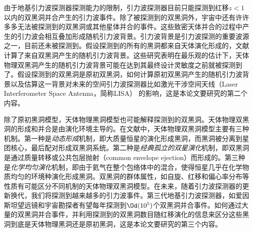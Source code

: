 由于地基引力波探测器探测能力的限制，\lvc 引力波探测器目前只能探测到红移$z<1$以内的双黑洞并合产生的引力波事件\citep{TheLIGOScientific:2016htt,Aasi:2013wya}。除了被\lvc 探测到的双黑洞外，宇宙中还有许许多多无法被\lvc 探测到的双黑洞或其他星体并合的事件。这些致密天体并合的过程中产生的引力波会相互叠加形成随机引力波背景\citep{Christensen:1992wi}。引力波背景是引力波探测的重要波源之一，目前还未被探测到。假设\lvc 探测到的所有的黑洞都来自天体演化形成的\citep{Belczynski:2010tb,Miller:2016krr,TheLIGOScientific:2016htt,Belczynski:2016obo,Stevenson:2017tfq}，文献\cite{TheLIGOScientific:2016wyq,TheLIGOScientific:2016dpb}计算了来自双黑洞产生的随机引力波背景。这些研究表明在最乐观的估计下，天体物理双黑洞产生的随机引力波背景可能在\lvc 达到其最终设计灵敏度之前就被探测到了。假设\lvc 探测到的双黑洞是原初双黑洞，如何计算原初双黑洞产生的随机引力波背景以及估算这一背景对未来的空间引力波探测器比如激光干涉空间天线（Laser Interferometer Space Antenna，简称LISA） \citep{Audley:2017drz}的影响，这是本论文要研究的第二个内容。


除了原初黑洞模型，天体物理黑洞模型也可能解释\lvc 探测到的双黑洞。天体物理双黑洞的形成和并合是由演化环境主导的。在文献中，天体物理双黑洞模型主要有三种机制。第一种是\textit{动态形成}机制，即大质量恒星的演化形成黑洞，而黑洞被分离到星团核心，最后配对形成双黑洞系统\cite{Rodriguez:2015oxa,Rodriguez:2016kxx,Park:2017zgj}。第二种是\textit{经典孤立的双星演化}机制，即双黑洞是通过质量转移或公共包层抛射（common envelope ejection）而形成的\cite{Belczynski:2014iua,Belczynski:2016obo,Woosley:2016nnw,Rodriguez:2018rmd,Choksi:2018jnq}。第三种是\textit{化学均匀演化}机制，即由于氦气在整个包络体中的混合\cite{2010AIPC.1314..291D,deMink:2016vkw}，使得恒星几乎在化学物质均匀的环境种演化形成黑洞。双黑洞的群体属性，如自旋\cite{Farr:2017uvj,Tiwari:2018qch,Ng:2018neg,Stevenson:2017dlk,Bogomazov:2018prw,Lopez:2018nkj,Sedda:2018nxm,Farr:2017gtv}、红移\cite{Fishbach:2018edt,Emami:2018taj,Bai:2018shq}和偏心率分布\cite{Samsing:2013kua,Samsing:2017xmd,Samsing:2017jnz,Lower:2018seu}等性质有可能区分不同机制的天体物理双黑洞模型。在未来，随着引力波探测器的更新换代，我们将探测到越来越多的引力波事件。第三代地基引力波探测器，如爱因斯坦望远镜\cite{Punturo:2010zz}和宇宙勘探者\cite{Evans:2016mbw}有望每年探测到$\Od(10^5)$\cite{Regimbau:2016ike,Vitale:2018yhm}个双黑洞并合事件。如何通过大量的双黑洞并合事件，并利用探测到的双黑洞数目随红移演化的信息来区分这些黑洞到底是天体物理黑洞还是原初黑洞，这是本论文要研究的第三个内容。

